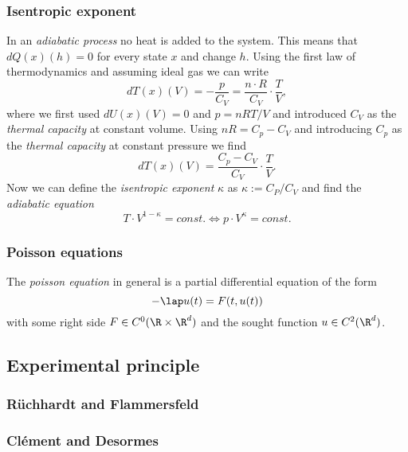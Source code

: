 \documentclass{subfiles}
\begin{document}
        \subsubsection*{Isentropic exponent}
            In an \emph{adiabatic process} no heat is added to the system. This means that $dQ(x)(h) = 0$ for every state $x$ and change $h$. Using the first law of thermodynamics and assuming ideal gas we can write
            \[dT(x)(V) = -\frac{p}{C_V} = \frac{n\cdot R}{C_V}\cdot\frac{T}{V},\]
            where we first used $dU(x)(V) = 0$ and $p = nRT/V$ and introduced $C_V$ as the \emph{thermal capacity} at constant volume. Using $nR = C_p-C_V$ and introducing $C_p$ as the \emph{thermal capacity} at constant pressure we find
            \[dT(x)(V) = \frac{C_p-C_V}{C_V} \cdot\frac{T}{V}.\]
            Now we can define the \emph{isentropic exponent} $\kappa$ as $\kappa:=C_P/C_V$ and find the \emph{adiabatic equation}
            \[T\cdot V^{1-\kappa} = \textit{const}. \Longleftrightarrow p\cdot V^\kappa = \textit{const}.\]

        \subsubsection*{Poisson equations}
            The \emph{poisson equation} in general is a partial differential equation of the form
            \[-\lap u(t) = F(t,u(t))\]
            with some right side $F\in C^0(\R\times\R^d)$ and the sought function $u\in C^2(\R^d)$.
    
    \subsection{Experimental principle}

        \subsubsection*{Rüchhardt and Flammersfeld}

        \subsubsection*{Clément and Desormes}



\end{document}
